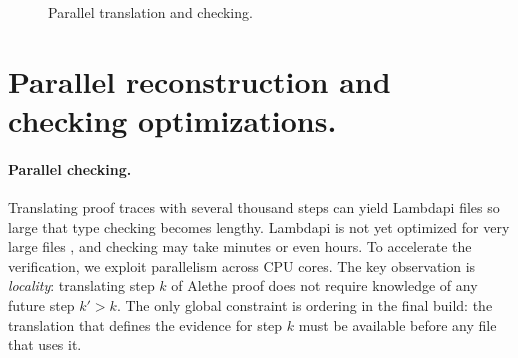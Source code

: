 \begin{figure}[t]
\caption{Parallel translation and checking.}
\label{fig:parallel-check}
\end{figure}

\section[Parallel reconstruction and checking]{Parallel reconstruction and checking optimizations.}
\label{ssec:parallel}


\paragraph{Parallel checking.}

Translating proof traces with several thousand steps can yield Lambdapi files so large that type checking becomes lengthy.
Lambdapi is not yet optimized for very large files \cite[\S 4]{blanqui:hal-04613926}, and checking may take minutes or even hours.
To accelerate the verification, we exploit parallelism across CPU cores.
The key observation is \emph{locality}: translating step $k$ of Alethe proof does not require knowledge of any future step $k' > k$.
The only global constraint is ordering in the final build: the translation that defines the evidence for step $k$ must be available before any file that uses it.

